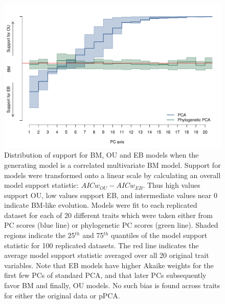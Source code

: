 \documentclass[a4paper,11pt]{article}
\begin{document}
\begin{figure}[p]
\centering
\includegraphics[scale=0.65]{./fig/mv-bm-aic.pdf}
\caption{Distribution of support for BM, OU and EB models when the generating model is a correlated multivariate BM model. Support for models were transformed onto a linear scale by calculating an overall model support statistic: $AICw_{OU} - AICw_{EB}$. Thus high values support OU, low values support EB, and intermediate values near 0 indicate BM-like evolution. Models were fit to each replicated dataset for each of 20 different traits which were taken either from PC scores (blue line) or phylogenetic PC scores (green line). Shaded regions indicate the 25$^{th}$ and 75$^{th}$ quantiles of the model support statistic for  100 replicated datasets. The red line indicates the average model support statistic averaged over all 20 original trait variables. Note that EB models have higher Akaike weights for the first few PCs of standard PCA, and that later PCs subsequently favor BM and finally, OU models. No such bias is found across traits for either the original data or pPCA.}
\label{corbm}
\end{figure}
\end{document}
